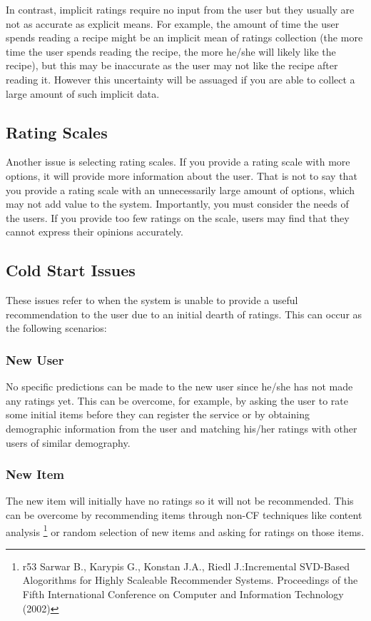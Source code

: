 In contrast, implicit ratings require no input from the user but they usually are not as accurate as explicit means. For example, the amount of time the user spends reading a recipe might be an implicit mean of ratings collection (the more time the user spends reading the recipe, the more he/she will likely like the recipe), but this may be inaccurate as the user may not like the recipe after reading it. However this uncertainty will be assuaged if you are able to collect a large amount of such implicit data. 

\subsection{Rating Scales }

Another issue is selecting rating scales. If you provide a rating scale with more options, it will provide more information about the user. That is not to say that you provide a rating scale with an unnecessarily large amount of options, which may not add value to the system. Importantly, you must consider the needs of the users. If you provide too few ratings on the scale, users may find that they cannot express their opinions accurately. 

\subsection{Cold Start Issues}

These issues refer to when the system is unable to provide a useful recommendation to the user due to an initial dearth of ratings. This can occur as the following scenarios:

\subsubsection{New User}
No specific predictions can be made to the new user since he/she has not made any ratings yet. This can be overcome, for example, by asking the user to rate some initial items before they can register the service or by obtaining demographic information from the user and matching his/her ratings with other users of similar demography.

\subsubsection{New Item }
The new item will initially have no ratings so it will not be recommended. This can be overcome by recommending items through non-CF techniques like content analysis \footnote{r53 Sarwar B., Karypis G., Konstan J.A., Riedl J.:Incremental SVD-Based Alogorithms for Highly Scaleable Recommender Systems. Proceedings of the Fifth International Conference on Computer and Information Technology (2002)} or random selection of new items and asking for ratings on those items.

